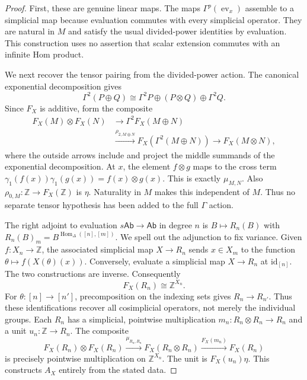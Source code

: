\begin{proof}
First, these are genuine linear maps. The maps
$\Gamma^p(\operatorname{ev}_x)$ assemble to a simplicial map because
evaluation commutes with every simplicial operator. They are natural
in $M$ and satisfy the usual divided-power identities by evaluation.
This construction uses no assertion that scalar extension commutes
with an infinite Hom product.

We next recover the tensor pairing from the divided-power action.
The canonical exponential decomposition gives
\[
 \Gamma^2(P\oplus Q)
 \cong\Gamma^2P\oplus(P\otimes Q)\oplus\Gamma^2Q.
\]
Since $F_X$ is additive, form the composite
\begin{align*}
 F_X(M)\otimes F_X(N)
 &\longrightarrow\Gamma^2F_X(M\oplus N)\\
 &\xrightarrow{\rho_{2,M\oplus N}}F_X(\Gamma^2(M\oplus N))
 \longrightarrow F_X(M\otimes N),
\end{align*}
where the outside arrows include and project the middle summands of
the exponential decomposition. At $x$, the element $f\otimes g$
maps to the cross term
$\gamma_1(f(x))\gamma_1(g(x))=f(x)\otimes g(x)$.
This is exactly $\mu_{M,N}$. Also
$\rho_{0,M}:\mathbb Z\to F_X(\mathbb Z)$ is $\eta$.
Naturality in $M$ makes this independent of $M$. Thus no separate
tensor hypothesis has been added to the full $\Gamma$ action.

The right adjoint to evaluation $s\mathsf{Ab}\to\mathsf{Ab}$ in degree
$n$ is $B\mapsto R_n(B)$ with
$R_n(B)_m=B^{\operatorname{Hom}_\Delta([n],[m])}$. We spell out the
adjunction to fix variance. Given $f:X_n\to\mathbb Z$, the associated
simplicial map $X\to R_n$ sends $x\in X_m$ to the function
$\theta\mapsto f(X(\theta)(x))$. Conversely, evaluate a simplicial
map $X\to R_n$ at $\mathrm{id}_{[n]}$. The two constructions are
inverse. Consequently
\[
 F_X(R_n)\cong\mathbb Z^{X_n}.
\]
For $\theta:[n]\to[n']$, precomposition on the indexing sets gives
$R_n\to R_{n'}$. Thus these identifications recover all cosimplicial
operators, not merely the individual groups. Each $R_n$ has a
simplicial, pointwise multiplication
$m_n:R_n\otimes R_n\to R_n$ and a unit $u_n:\mathbb Z\to R_n$.
The composite
\[
 F_X(R_n)\otimes F_X(R_n)
 \xrightarrow{\mu_{R_n,R_n}}F_X(R_n\otimes R_n)
 \xrightarrow{F_X(m_n)}F_X(R_n)
\]
is precisely pointwise multiplication on $\mathbb Z^{X_n}$.
The unit is $F_X(u_n)\eta$. This constructs $A_X$ entirely from the
stated data.


\end{proof}
